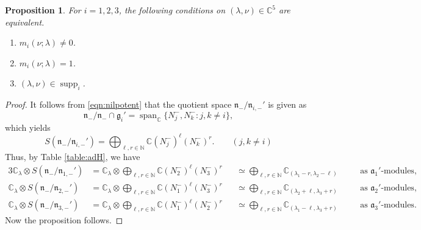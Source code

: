 \documentclass[a4paper,11pt,reqno]{amsart}
\newcommand{\fraka}{\mathfrak{a}}
\newcommand{\frakg}{\mathfrak{g}}
\newcommand{\frakn}{\mathfrak{n}}
\newcommand{\CC}{\mathbb{C}}
\newcommand{\0}{{\bf 0}}
\newcommand{\N}{\mathbb{N}}
\newcommand{\C}{\mathbb{C}}
\newcommand{\1}{{\bf 1}}
\DeclareMathOperator{\Span}{span}
\DeclareMathOperator{\supp}{supp}
\theoremstyle{plain}
\newtheorem{proposition}[equation]{Proposition}
\theoremstyle{definition}
\numberwithin{equation}{section}
\theoremstyle{definition}
\begin{document}
\begin{proposition}\label{prop:BranchingEmb}
For $i=1,2,3$, the following conditions on 
$(\lambda, \nu) \in \CC^5$ are 
equivalent.

\begin{enumerate}[label=\normalfont{(\roman*)}]
\item
$m_i(\nu;\lambda)\neq 0$.
\vspace{3pt}

\item
$m_i(\nu;\lambda)=1$.
\vspace{3pt}

\item $(\lambda,\nu) \in \supp_{i}$.

\end{enumerate}

\end{proposition}

\begin{proof}
It follows from \eqref{eqn:nilpotent} that the quotient space
$\frakn_-/\frakn_{i,-}'$ is given as
\begin{equation*}
\frakn_-/\frakn_- \cap \frakg_i' = 
\Span_\C\{N_j^-, N_k^-: j,k\neq i\},
\end{equation*}
which yields
\begin{equation*}
S(\frakn_-/\frakn_{i,-}')
= \bigoplus_{\ell, r \in \N} \C(N_j^-)^\ell(N_k^-)^r.\qquad(j,k\neq i)
\end{equation*}
Thus, by Table \ref{table:adH}, we have
\begin{alignat*}{3}
\C_{\lambda}\otimes S(\frakn_-/\frakn_{1,-}')
&= \C_{\lambda}\otimes \bigoplus_{\ell, r \in \N} \C(N_2^-)^\ell(N_3^-)^r
&&\simeq \bigoplus_{\ell,r \in \N}\C_{(\lambda_1-r,\lambda_2-\ell)}
&&\quad \text{as $\fraka_1'$-modules},\\[3pt]
\C_{\lambda}\otimes S(\frakn_-/\frakn_{2,-}')  
&= \C_{\lambda}\otimes\bigoplus_{\ell, r \in \N} \C(N_1^-)^\ell(N_3^-)^r 
&&\simeq \bigoplus_{\ell,r \in \N}\C_{(\lambda_2+\ell,\lambda_3+r)}
&&\quad \text{as $\fraka_2'$-modules},\\[3pt]
\C_{\lambda}\otimes S(\frakn_-/\frakn_{3,-}')
&=\C_{\lambda}\otimes \bigoplus_{\ell,r \in \N} \C(N_1^-)^\ell(N_2^-)^r
&&\simeq \bigoplus_{\ell,r \in \N}\C_{(\lambda_1-\ell,\lambda_3+r)}
&&\quad \text{as $\fraka_3'$-modules}.
\end{alignat*}
Now the proposition follows.
\end{proof}
\end{document}
